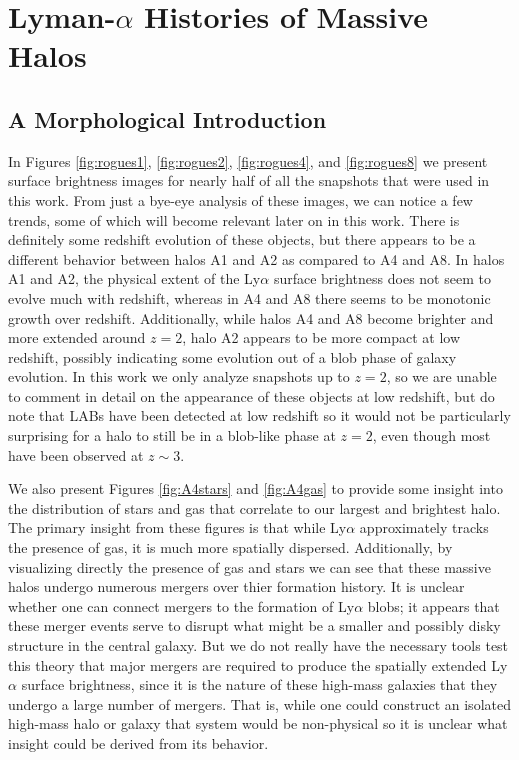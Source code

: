 \chapter{Lyman-\texorpdfstring{$\alpha$}{a} Histories of Massive Halos}

\section{A Morphological Introduction}

In Figures \ref{fig:rogues1}, \ref{fig:rogues2}, \ref{fig:rogues4}, and \ref{fig:rogues8} we present surface brightness images for nearly half of all the snapshots that were used in this work.
From just a bye-eye analysis of these images, we can notice a few trends, some of which will become relevant later on in this work.
There is definitely some redshift evolution of these objects, but there appears to be a different behavior between halos A1 and A2 as compared to A4 and A8.
In halos A1 and A2, the physical extent of the Ly$\alpha$ surface brightness does not seem to evolve much with redshift, whereas in A4 and A8 there seems to be monotonic growth over redshift.
Additionally, while halos A4 and A8 become brighter and more extended around $z=2$, halo A2 appears to be more compact at low redshift, possibly indicating some evolution out of a blob phase of galaxy evolution.
In this work we only analyze snapshots up to $z=2$, so we are unable to comment in detail on the appearance of these objects at low redshift, but do note that LABs have been detected at low redshift \citep{Barger2012,Prescott2013} so it would not be particularly surprising for a halo to still be in a blob-like phase at $z=2$, even though most have been observed at $z\sim3$.

We also present Figures \ref{fig:A4stars} and \ref{fig:A4gas} to provide some insight into the distribution of stars and gas that correlate to our largest and brightest halo.
The primary insight from these figures is that while Ly$\alpha$ approximately tracks the presence of gas, it is much more spatially dispersed.
Additionally, by visualizing directly the presence of gas and stars we can see that these massive halos undergo numerous mergers over thier formation history.
It is unclear whether one can connect mergers to the formation of Ly$\alpha$ blobs; it appears that these merger events serve to disrupt what might be a smaller and possibly disky structure in the central galaxy.
But we do not really have the necessary tools test this theory that major mergers are required to produce the spatially extended Ly$\alpha$ surface brightness, since it is the nature of these high-mass galaxies that they undergo a large number of mergers.
That is, while one could construct an isolated high-mass halo or galaxy that system would be non-physical so it is unclear what insight could be derived from its behavior.

